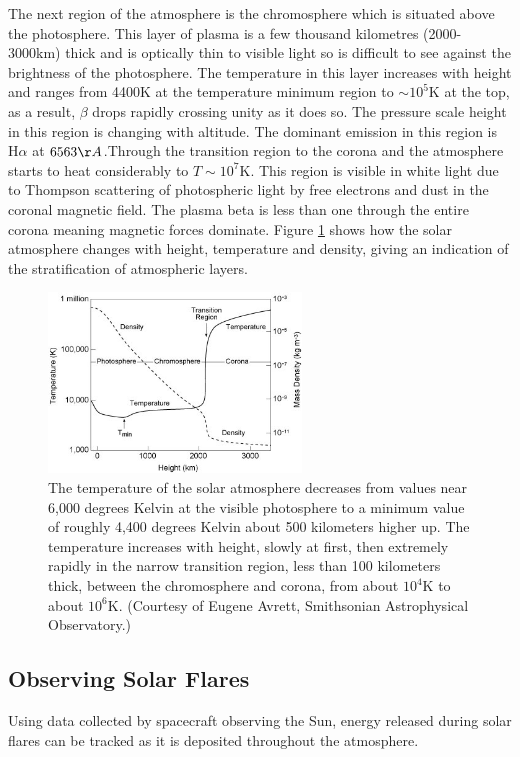 The next region of the atmosphere is the chromosphere which is situated above the photosphere. This layer of plasma is a few thousand kilometres (2000-3000km) thick and is optically thin to visible light so is difficult to see against the brightness of the photosphere. The temperature in this layer increases with height and ranges from 4400K at the temperature minimum region to $\sim10^{5}$K at the top, as a result, $\beta$ drops rapidly crossing unity as it does so. The pressure scale height in this region is changing with altitude. The dominant emission in this region is H$\alpha$ at $6563\AA$.Through the transition region to the corona and the atmosphere starts to heat considerably to $T\sim10^{7}$K. This region is visible in white light due to Thompson scattering of photospheric light by free electrons and dust in the coronal magnetic field. The plasma beta is less than one through the entire corona meaning magnetic forces dominate. Figure \ref{solatm} shows how the solar atmosphere changes with height, temperature and density, giving an indication of the stratification of atmospheric layers.

\begin{figure}[H]
  \begin{center}
    \includegraphics[width=0.6\textwidth]{solar-atm-plot}
\caption{The temperature of the solar atmosphere decreases from values near 6,000 degrees Kelvin at the visible photosphere to a minimum value of roughly 4,400 degrees Kelvin about 500 kilometers higher up. The temperature increases with height, slowly at first, then extremely rapidly in the narrow transition region, less than 100 kilometers thick, between the chromosphere and corona, from about $10^{4}$K to about $10^{6}$K. (Courtesy of Eugene Avrett, Smithsonian Astrophysical Observatory.)}\label{solatm}
  \end{center}
\end{figure}

  
\subsection{Observing Solar Flares}
Using data collected by spacecraft observing the Sun, energy released during solar flares can be tracked as it is deposited throughout the atmosphere. 

